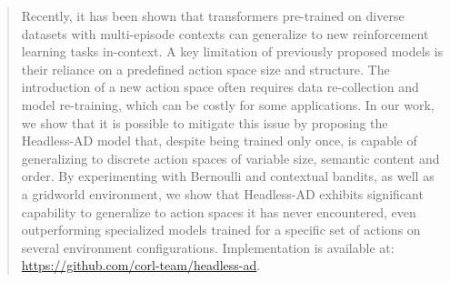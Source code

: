 \documentclass{article}
\theoremstyle{plain}
\theoremstyle{definition}
\theoremstyle{remark}
\begin{document}
\printAffiliationsAndNotice{\icmlEqualContribution}
\begin{abstract}
Recently, it has been shown that transformers pre-trained on diverse datasets with multi-episode contexts can generalize to new reinforcement learning tasks in-context. A key limitation of previously proposed models is their reliance on a predefined action space size and structure. The introduction of a new action space often requires data re-collection and model re-training, which can be costly for some applications. In our work, we show that it is possible to mitigate this issue by proposing the Headless-AD model that, despite being trained only once, is capable of generalizing to discrete action spaces of variable size, semantic content and order. By experimenting with Bernoulli and contextual bandits, as well as a gridworld environment, we show that Headless-AD exhibits significant capability to generalize to action spaces it has never encountered, even outperforming specialized models trained for a specific set of actions on several environment configurations. Implementation is available at: \url{https://github.com/corl-team/headless-ad}.
\end{abstract}
\end{document}
